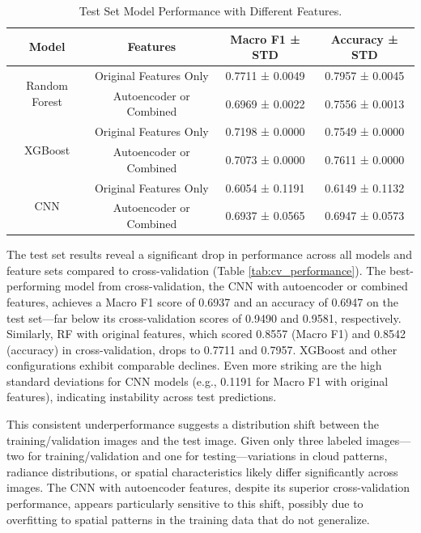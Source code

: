 \documentclass[10pt,letterpaper]{article}
\begin{document}
\begin{table}[ht]
    \centering
    \caption{Test Set Model Performance with Different Features.}
    \label{tab:test_performance}
    \begin{tabular}{cccc}
    \hline
    \textbf{Model}                 & \textbf{Features}                & \textbf{Macro F1 ± STD} & \textbf{Accuracy ± STD} \\ \hline
    \multirow{2}{*}{Random Forest} & Original Features Only           & 0.7711 ± 0.0049         & 0.7957 ± 0.0045         \\
                                   & Autoencoder or Combined          & 0.6969 ± 0.0022         & 0.7556 ± 0.0013         \\
    \multirow{2}{*}{XGBoost}       & Original Features Only           & 0.7198 ± 0.0000         & 0.7549 ± 0.0000         \\
                                   & Autoencoder or Combined          & 0.7073 ± 0.0000         & 0.7611 ± 0.0000         \\
    \multirow{2}{*}{CNN}           & Original Features Only           & 0.6054 ± 0.1191         & 0.6149 ± 0.1132         \\
                                   & Autoencoder or Combined          & 0.6937 ± 0.0565         & 0.6947 ± 0.0573         \\
    \hline
    \end{tabular}
\end{table}

The test set results reveal a significant drop in performance across all models and feature sets compared to cross-validation (Table \ref{tab:cv_performance}). The best-performing model from cross-validation, the CNN with autoencoder or combined features, achieves a Macro F1 score of 0.6937 and an accuracy of 0.6947 on the test set—far below its cross-validation scores of 0.9490 and 0.9581, respectively. Similarly, RF with original features, which scored 0.8557 (Macro F1) and 0.8542 (accuracy) in cross-validation, drops to 0.7711 and 0.7957. XGBoost and other configurations exhibit comparable declines. Even more striking are the high standard deviations for CNN models (e.g., 0.1191 for Macro F1 with original features), indicating instability across test predictions.

This consistent underperformance suggests a distribution shift between the training/validation images and the test image. Given only three labeled images—two for training/validation and one for testing—variations in cloud patterns, radiance distributions, or spatial characteristics likely differ significantly across images. The CNN with autoencoder features, despite its superior cross-validation performance, appears particularly sensitive to this shift, possibly due to overfitting to spatial patterns in the training data that do not generalize.
\end{document}
